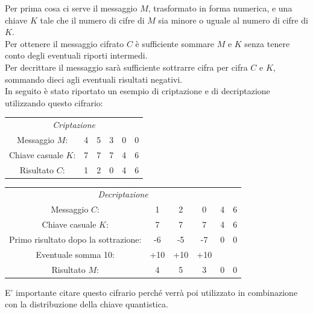 \documentclass[italian,A4,12pt]{article}
\begin{document}
    Per prima cosa ci serve il messaggio $M$,  trasformato in forma numerica, e una chiave $K$ tale che il numero di cifre di $M$ sia minore o uguale al numero di cifre di $K$.\\
    Per ottenere il messaggio cifrato $C$ è sufficiente sommare $M$ e $K$ senza tenere conto degli eventuali riporti intermedi.\\
    Per decrittare il messaggio sarà sufficiente sottrarre cifra per cifra $C$ e $K$, sommando dieci agli eventuali risultati negativi.\\
    In seguito è stato riportato un esempio di criptazione e di decriptazione utilizzando questo cifrario:
    \begin{center}
      \begin{tabular}{c c c c c c}
        \multicolumn{6}{c}{\textit{Criptazione}}\\
        Messaggio $M$:&4&5&3&0&0\\
        Chiave casuale $K$:&7&7&7&4&6\\
        \hline
        Risultato $C$: & 1&2&0&4&6\\
      \end{tabular}
    \end{center}
    \begin{center}
      \begin{tabular}{c c c c c c}
        \multicolumn{6}{c}{\textit{Decriptazione}}\\
        Messaggio $C$:&1&2&0&4&6\\
        Chiave casuale $K$:&7&7&7&4&6\\
        Primo risultato dopo la sottrazione:&-6&-5&-7&0&0\\
        Eventuale somma 10:&+10&+10&+10\\
        \hline
        Risultato $M$: & 4&5&3&0&0\\
      \end{tabular}
    \end{center}
    E' importante citare questo cifrario perché verrà poi utilizzato in combinazione con la distribuzione della chiave quantistica.\\
\end{document}
